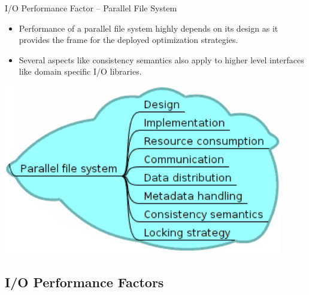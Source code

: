 \documentclass[compress,11pt,xcolor=svgnames,aspectratio=169]{beamer}
\begin{document}
\begin{frame}[fragile] {I/O Performance Factor -- Parallel File System}

\begin{itemize}
\setlength\itemsep{0.5cm}

  \item Performance of a parallel file system highly depends on its design as it provides the frame for the deployed optimization strategies.

  \item Several aspects like consistency semantics also apply to higher level interfaces like domain specific I/O libraries.

\end{itemize}


\begin{center}
\includegraphics[scale=0.5]{fig/tree-io-pfs}
\end{center}

\nocite{SOPPOAASLK13}

\end{frame}

\subsection{I/O Performance Factors}
\end{document}
